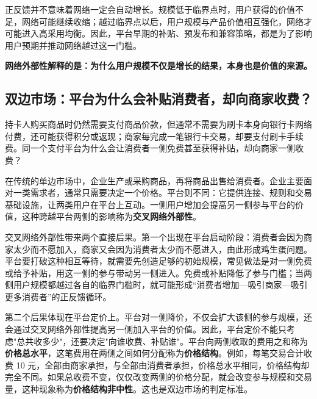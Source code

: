 \documentclass[twoside,10pt,openany]{ctexbook}
\theoremstyle{defstyle}
\newcommand{\important}[1]{{\color{blue}\textbf{#1}}} %
\begin{document}
正反馈并不意味着网络一定会自动增长。规模低于临界点时，用户获得的价值不足，网络可能继续收缩；越过临界点以后，用户规模与产品价值相互强化，网络才可能进入高采用均衡。因此，平台早期的补贴、预发布和兼容策略，都是为了影响用户预期并推动网络越过这一门槛。

\begin{center}
\important{网络外部性解释的是：为什么用户规模不仅是增长的结果，本身也是价值的来源。}
\end{center}

\subsection{双边市场：平台为什么会补贴消费者，却向商家收费？}

持卡人购买商品时仍然需要支付商品价款，但通常不需要为刷卡本身向银行卡网络付费，还可能获得积分或返现；商家每完成一笔银行卡交易，却要支付刷卡手续费。同一个支付平台为什么会让消费者一侧免费甚至获得补贴，却向商家一侧收费？

在传统的单边市场中，企业生产或采购商品，再将商品出售给消费者。企业主要面对一类需求者，通常只需要决定一个价格。平台则不同：它提供连接、规则和交易基础设施，让两类用户在平台上互动。一侧用户增加会提高另一侧参与平台的价值，这种跨越平台两侧的影响称为\textbf{交叉网络外部性}。

交叉网络外部性带来两个直接后果。第一个出现在平台启动阶段：消费者会因为商家太少而不愿加入，商家又会因为消费者太少而不愿进入，由此形成鸡生蛋问题。平台要打破这种相互等待，就需要先创造足够的初始规模，常见做法是对一侧免费或给予补贴，用这一侧的参与带动另一侧进入。免费或补贴降低了参与门槛；当两侧用户规模都越过各自的临界门槛时，就可能形成“消费者增加—吸引商家—吸引更多消费者”的正反馈循环。

第二个后果体现在平台定价上。平台对一侧降价，不仅会扩大该侧的参与规模，还会通过交叉网络外部性提高另一侧加入平台的价值。因此，平台定价不能只考虑"总共收多少"，还要决定"向谁收费、补贴谁"。平台向两侧收取的费用之和称为\textbf{价格总水平}，这笔费用在两侧之间如何分配称为\textbf{价格结构}。例如，每笔交易合计收费 10 元，全部由商家承担，与全部由消费者承担，价格总水平相同，价格结构却完全不同。如果总收费不变，仅仅改变两侧的价格分配，就会改变参与规模和交易量，这种现象称为\textbf{价格结构非中性}。这也是双边市场的判定标准。
\end{document}
